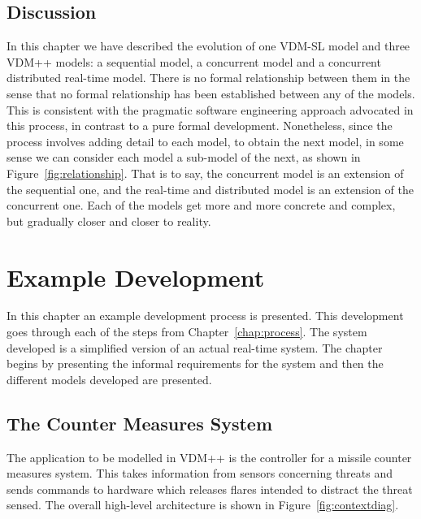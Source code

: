 \documentclass{overturerepchap}
\begin{document}
\section{Discussion}

In this chapter we have described the evolution of one VDM-SL model
and three VDM++ models: a sequential model, a concurrent model and a
concurrent distributed real-time model. There is no formal relationship between
them in the sense that no formal relationship has been established
between any of the models. This is consistent with the pragmatic
software engineering approach advocated in this process, in contrast
to a pure formal development. Nonetheless, since the process involves
adding detail to each model, to obtain the next model, in some sense
we can consider each model a sub-model of the next, as shown in
Figure~\ref{fig:relationship}. 
That is to say, the concurrent model is an extension of the
sequential one, and the real-time and distributed model is an
extension of the concurrent one. Each of the models get more and more
concrete and complex, but gradually closer and closer to reality.

\chapter{Example Development}\label{chap:example}

In this chapter an example development process is presented. This
development goes through each of the steps from
Chapter~\ref{chap:process}. The system developed is a simplified
version of an actual real-time system. The chapter begins by
presenting the informal requirements for the system and then the
different models developed are presented.

\section{The Counter Measures System}\label{sec:CMdesc}

The application to be modelled in VDM++ is the controller for a
missile counter measures system. This takes information from sensors
concerning threats and sends commands to hardware which releases
flares intended to distract the threat sensed.  The overall high-level
architecture is shown in Figure~\ref{fig:contextdiag}.
\end{document}
